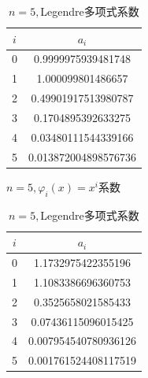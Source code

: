 \documentclass[UTF8,ctexart,a4paper,11pt,openany]{article}
\theoremstyle{definition}
\begin{document}
    \begin{table}[H]
        \centering
        \begin{minipage}{0.49\linewidth}
            \centering
            \begin{tabular}{|c|c|}
            \hline
        $i$& $a_i$\\
    \hline
        0 &  0.9999975939481748\\
        \hline
        1 &  1.000099801486657 \\
        \hline
        2 &  0.49901917513980787 \\
        \hline
        3 &  0.1704895392633275\\
        \hline
        4 &  0.03480111544339166\\
        \hline
        5 &  0.013872004898576736\\
        \hline
            \end{tabular}
            \caption{$n=5,\varphi_i(x)=x^i$系数}
        \end{minipage}
        \hfill
        \begin{minipage}{0.45\linewidth}
            \centering
            \begin{tabular}{|c|c|}
        \hline
        $i$ &$a_i$  \\
        \hline
        0   &  1.1732975422355196\\
        \hline
        1   &  1.1083386696360753\\
        \hline
        2   &  0.3525658021585433\\
        \hline
        3   &  0.07436115096015425\\
        \hline
        4   &  0.007954540780936126\\
        \hline
        5   &  0.001761524408117519\\
        \hline
            \end{tabular}
            \caption{$n=5,$Legendre多项式系数}
            \end{minipage}
    \end{table}
\end{document}
